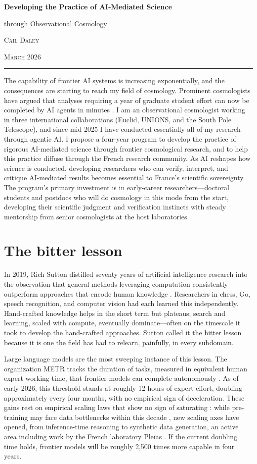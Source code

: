 \documentclass[11pt, a4paper]{article}
\newcommand{\headingfont}{\sffamily}
\renewcommand{\maketitle}{%
  \begin{center}
    {\LARGE\headingfont\bfseries Developing the Practice of AI-Mediated Science\par}
    \vspace{0.3em}
    {\large\headingfont through Observational Cosmology\par}
    \vspace{0.6em}
    {\normalsize\scshape Cail Daley\par}
    \vspace{0.15em}
    {\small\scshape March 2026}
  \end{center}
  \vspace{0.3em}
  \noindent\rule{\textwidth}{0.4pt}
  \vspace{0.8em}
}
\begin{document}
\thispagestyle{plain}
\maketitle

The capability of frontier AI systems is increasing exponentially, and the consequences are starting to reach my field of cosmology.
Prominent cosmologists have argued that analyses requiring a year of graduate student effort can now be completed by AI agents in minutes \citep{dodelson26}.
I am an observational cosmologist working in three international collaborations (Euclid, UNIONS, and the South Pole Telescope), and since mid-2025 I have conducted essentially all of my research through agentic AI.
I propose a four-year program to develop the practice of rigorous AI-mediated science through frontier cosmological research, and to help this practice diffuse through the French research community.
As AI reshapes how science is conducted, developing researchers who can verify, interpret, and critique AI-mediated results becomes essential to France's scientific sovereignty.
The program's primary investment is in early-career researchers---doctoral students and postdocs who will do cosmology in this mode from the start, developing their scientific judgment and verification instincts with steady mentorship from senior cosmologists at the host laboratories.

\section{The bitter lesson}

In 2019, Rich Sutton distilled seventy years of artificial intelligence research into the observation that general methods leveraging computation consistently outperform approaches that encode human knowledge \citep{sutton19}.
Researchers in chess, Go, speech recognition, and computer vision had each learned this independently.
Hand-crafted knowledge helps in the short term but plateaus; search and learning, scaled with compute, eventually dominate---often on the timescale it took to develop the hand-crafted approaches.
Sutton called it the bitter lesson because it is one the field has had to relearn, painfully, in every subdomain.

Large language models are the most sweeping instance of this lesson.
The organization METR tracks the duration of tasks, measured in equivalent human expert working time, that frontier models can complete autonomously \citep{metr26}.
As of early 2026, this threshold stands at roughly 12 hours of expert effort, doubling approximately every four months, with no empirical sign of deceleration.
These gains rest on empirical scaling laws that show no sign of saturating \citep{kaplan.etal20, hoffmann.etal22}: while pre-training may face data bottlenecks within this decade \citep{villalobos.etal22}, new scaling axes have opened, from inference-time reasoning \citep{snell.etal24} to synthetic data generation, an active area including work by the French laboratory Ple\"ias \citep{langlais.etal25}.
If the current doubling time holds, frontier models will be roughly 2,500 times more capable in four years.
\end{document}
